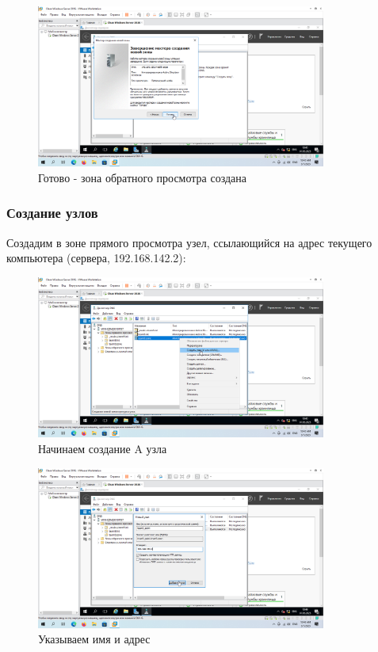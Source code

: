 \documentclass[a4paper]{article}
\begin{document}
  \begin{figure}[H]
    \centering
    \includegraphics[width=0.85\textwidth]{9_0084}
    \caption{Готово - зона обратного просмотра создана}
    \label{img:0084}
  \end{figure}

  \subsubsection{Создание узлов}

  Создадим в зоне прямого просмотра узел, ссылающийся на адрес текущего компьютера
  (сервера, 192.168.142.2):

  \begin{figure}[H]
    \centering
    \includegraphics[width=0.85\textwidth]{9_0085}
    \caption{Начинаем создание A узла}
    \label{img:0085}
  \end{figure}

  \begin{figure}[H]
    \centering
    \includegraphics[width=0.85\textwidth]{9_0086}
    \caption{Указываем имя и адрес}
    \label{img:0086}
  \end{figure}
\end{document}
